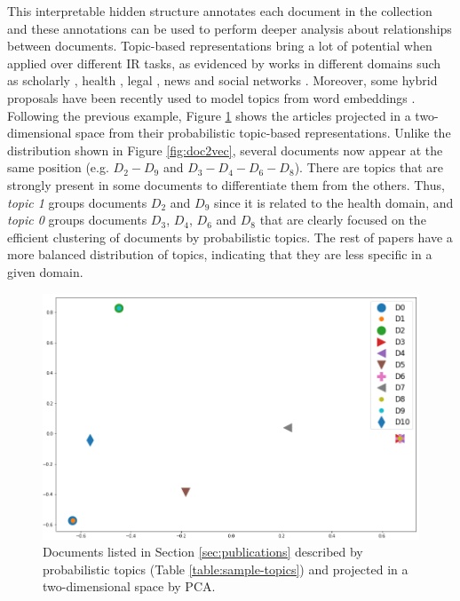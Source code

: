 This interpretable hidden structure annotates each document in the collection and these annotations can be used to perform deeper analysis about relationships between documents. Topic-based representations bring a lot of potential when applied over different IR tasks, as evidenced by works in different domains such as scholarly  \citep{Gatti2015}, health \citep{Lu2016, TapiNzali2017}, legal \citep{ONeill2017, Greene2016}, news \citep{He2017} and social networks \citep{Cheng2014a}. Moreover, some hybrid proposals have been recently used to model topics from word embeddings \citep{Dieng2020TopicMI}. Following the previous example, Figure \ref{fig:doctopics} shows the articles projected in a two-dimensional space from their probabilistic topic-based representations. Unlike the distribution shown in Figure \ref{fig:doc2vec}, several documents now appear at the same position (e.g. $D_2-D_9$ and $D_3-D_4-D_6-D_8$). There are topics that are strongly present in some documents to differentiate them from the others. Thus, \textit{topic 1} groups documents $D_2$ and $D_9$ since it is related to the health domain, and \textit{topic 0} groups documents $D_3$, $D_4$, $D_6$ and $D_8$ that are clearly focused on the efficient clustering of documents by probabilistic topics. The rest of papers have a more balanced distribution of topics, indicating that they are less specific in a given domain.

\begin{figure}[!htbp]
\centering
\includegraphics[scale=0.34]{doctopics.png}
\caption{Documents listed in Section \ref{sec:publications} described by probabilistic topics (Table \ref{table:sample-topics}) and projected in a two-dimensional space by PCA. }
\label{fig:doctopics}
\end{figure}

